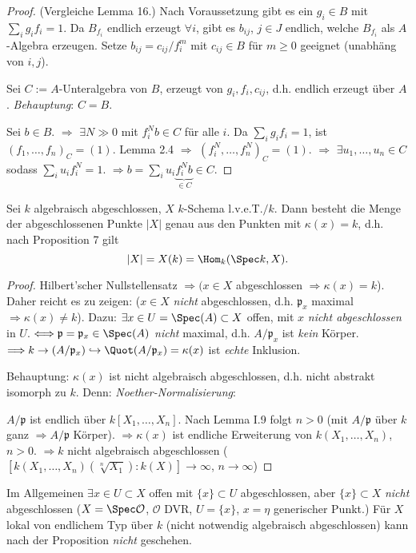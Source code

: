 \begin{proof}
(Vergleiche Lemma 16.) Nach Voraussetzung gibt es ein $g_{i}\in B$
mit $\sum_{i}g_{i}f_{i}=1$. Da $B_{f_{i}}$ endlich erzeugt $\forall i$,
gibt es $b_{ij}$, $j\in J$ endlich, welche $B_{f_{i}}$ als $A$-Algebra
erzeugen. Setze $b_{ij}=c_{ij}/f_{i}^{m}$ mit $c_{ij}\in B$ für
$m\geq0$ geeignet (unabhäng von $i,j$).

Sei $C:=A$-Unteralgebra von $B$, erzeugt von $g_{i},f_{i},c_{ij}$,
d.h. endlich erzeugt über $A$. \emph{Behauptung}: $C=B$.

Sei $b\in B$. $\Longrightarrow$ $\exists N\gg0$ mit $f_{i}^{N}b\in C$
für alle $i$. Da $\sum_{i}g_{i}f_{i}=1$, ist $(f_{1},\ldots,f_{n})_{C}=(1)$.
Lemma 2.4 $\Longrightarrow$ $(f_{i}^{N},\ldots,f_{n}^{N})_{C}=(1)$.
$\Longrightarrow$ $\exists u_{1},\ldots,u_{n}\in C$ sodass $\sum_{i}u_{i}f_{i}^{N}=1$.
$\Longrightarrow b=\sum_{i}u_{i}\underbrace{f_{i}^{N}b}_{\in C}\in C$.
\end{proof}
\begin{prop}[28]
Sei $k$ algebraisch abgeschlossen, $X$ $k$-Schema l.v.e.T.$/k$.
Dann besteht die Menge der abgeschlossenen Punkte $|X|$ genau aus
den Punkten mit $\kappa(x)=k$, d.h. nach Proposition 7 gilt
\[
|X|=X(k)=\Hom_{k}(\Spec k,X).
\]
\end{prop}

\begin{proof}
Hilbert'scher Nullstellensatz $\Longrightarrow(x\in X$ abgeschlossen
$\Rightarrow\kappa(x)=k$). Daher reicht es zu zeigen: ($x\in X$
\emph{nicht} abgeschlossen, d.h. $\mathfrak{p}_{x}$ maximal $\Rightarrow\kappa(x)\neq k$).
Dazu: $\exists x\in U=\Spec(A)\subset X$ offen, mit $x$ \emph{nicht
abgeschlossen} in $U$. $\Longleftrightarrow\mathfrak{p}=\mathfrak{p}_{x}\in\Spec(A)$
\emph{nicht} maximal, d.h. $A/\mathfrak{p}_{x}$ ist \emph{kein} Körper.
$\Longrightarrow k\rightarrow(A/\mathfrak{p}_{x})\hookrightarrow\Quot(A/\mathfrak{p}_{x})=\kappa(x)$
ist \emph{echte} Inklusion.

Behauptung: $\kappa(x)$ ist nicht algebraisch abgeschlossen, d.h.
nicht abstrakt isomorph zu $k$. Denn: \emph{Noether-Normalisierung}:

$A/\mathfrak{p}$ ist endlich über $k[X_{1},\ldots,X_{n}]$. Nach
Lemma I.9 folgt $n>0$ (mit $A/\mathfrak{p}$ über $k$ ganz $\Longrightarrow A/\mathfrak{p}$
Körper). $\Longrightarrow\kappa(x)$ ist endliche Erweiterung von
$k(X_{1},\ldots,X_{n})$, $n>0$. $\Longrightarrow k$ nicht algebraisch
abgeschlossen ($[k(X_{1},\ldots,X_{n})(\sqrt[n]{X_{1}}):k(X)]\rightarrow\infty$,
$n\rightarrow\infty$)
\end{proof}
\begin{rem*}
Im Allgemeinen $\exists x\in U\subset X$ offen mit $\{x\}\subset U$
abgeschlossen, aber $\{x\}\subset X$ \emph{nicht} abgeschlossen ($X=\Spec\mathcal{O}$,
$\mathcal{O}$ DVR, $U=\{x\}$, $x=\eta$ generischer Punkt.) Für
$X$ lokal von endlichem Typ über $k$ (nicht notwendig algebraisch
abgeschlossen) kann nach der Proposition \emph{nicht} geschehen.
\end{rem*}
